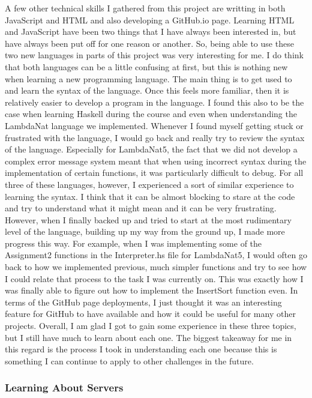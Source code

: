 \documentclass{article}
\theoremstyle{theorem}
\theoremstyle{definition}
\theoremstyle{remark}
\begin{document}
A few other technical skills I gathered from this project are writting in both JavaScript and HTML and also developing a GitHub.io page. Learning HTML and JavaScript have been two things that I have always been interested in, but have always been put off for one reason or another. So, being able to use these two 
new languages in parts of this project was very interesting for me. I do think that both languages can be a little confusing at first, but this is nothing new when learning a new programming language. The main thing is to get used to and learn the syntax of the language. Once this feels more familiar, then it 
is relatively easier to develop a program in the language. I found this also to be the case when learning Haskell during the course and even when understanding the LambdaNat language we implemented. Whenever I found myself getting stuck or frustrated with the language, I would go back and really try to review the 
syntax of the language. Especially for LambdaNat5, the fact that we did not develop a complex error message system meant that when using incorrect syntax during the implementation of certain functions, it was particularly difficult to debug. For all three of these languages, however, I experienced a sort of 
similar experience to learning the syntax. I think that it can be almost blocking to stare at the code and try to understand what it might mean and it can be very frustrating. However, when I finally backed up and tried to start at the most rudimentary level of the language, building up my way from the ground up, I made 
more progress this way. For example, when I was implementing some of the Assignment2 functions in the Interpreter.hs file for LambdaNat5, I would often go back to how we implemented previous, much simpler functions and try to see how I could relate that process to the task I was currently on. This was exactly how I was 
finally able to figure out how to implement the InsertSort function even. In terms of the GitHub page deployments, I just thought it was an interesting feature for GitHub to have available and how it could be useful for many other projects. Overall, I am glad I got to gain some experience in these three topics, but I still 
have much to learn about each one. The biggest takeaway for me in this regard is the process I took in understanding each one because this is something I can continue to apply to other challenges in the future. \\

\subsubsection{Learning About Servers}
\end{document}
